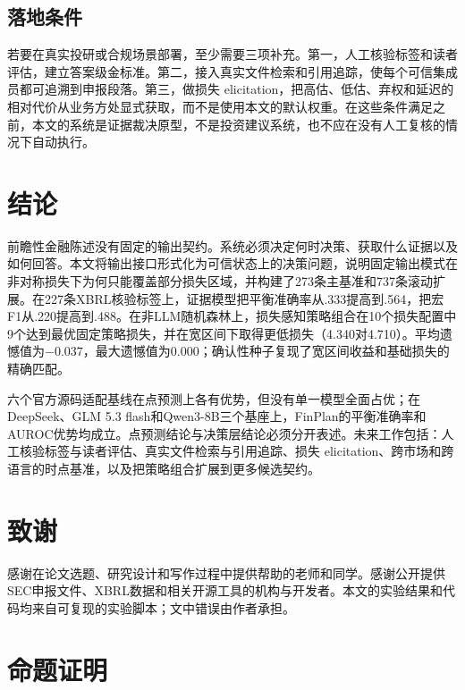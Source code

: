 \documentclass[12pt,openany]{ctexbook}
\newcommand{\sufehead}[1]{\chapter*{#1}\addcontentsline{toc}{chapter}{#1}}
\begin{document}
\section{落地条件}
若要在真实投研或合规场景部署，至少需要三项补充。第一，人工核验标签和读者评估，建立答案级金标准。第二，接入真实文件检索和引用追踪，使每个可信集成员都可追溯到申报段落。第三，做损失 elicitation，把高估、低估、弃权和延迟的相对代价从业务方处显式获取，而不是使用本文的默认权重。在这些条件满足之前，本文的系统是证据裁决原型，不是投资建议系统，也不应在没有人工复核的情况下自动执行。\par

\chapter{结论}
\label{ch:conclusion}
前瞻性金融陈述没有固定的输出契约。系统必须决定何时决策、获取什么证据以及如何回答。本文将输出接口形式化为可信状态上的决策问题，说明固定输出模式在非对称损失下为何只能覆盖部分损失区域，并构建了273条主基准和737条滚动扩展。在227条XBRL核验标签上，证据模型把平衡准确率从.333提高到.564，把宏F1从.220提高到.488。在非LLM随机森林上，损失感知策略组合在10个损失配置中9个达到最优固定策略损失，并在宽区间下取得更低损失（4.340对4.710）。平均遗憾值为$-0.037$，最大遗憾值为0.000；确认性种子复现了宽区间收益和基础损失的精确匹配。\par
六个官方源码适配基线在点预测上各有优势，但没有单一模型全面占优；在DeepSeek、GLM 5.3 flash和Qwen3-8B三个基座上，FinPlan的平衡准确率和AUROC优势均成立。点预测结论与决策层结论必须分开表述。未来工作包括：人工核验标签与读者评估、真实文件检索与引用追踪、损失 elicitation、跨市场和跨语言的时点基准，以及把策略组合扩展到更多候选契约。\par

\clearpage
{}
\printbibliography[heading=bibintoc,title={参考文献}]

\clearpage
\sufehead{致\quad 谢}
{\songti
感谢在论文选题、研究设计和写作过程中提供帮助的老师和同学。感谢公开提供SEC申报文件、XBRL数据和相关开源工具的机构与开发者。本文的实验结果和代码均来自可复现的实验脚本；文中错误由作者承担。\par
}

\appendix
\chapter{命题证明}
\label{app:proofs}
\end{document}
